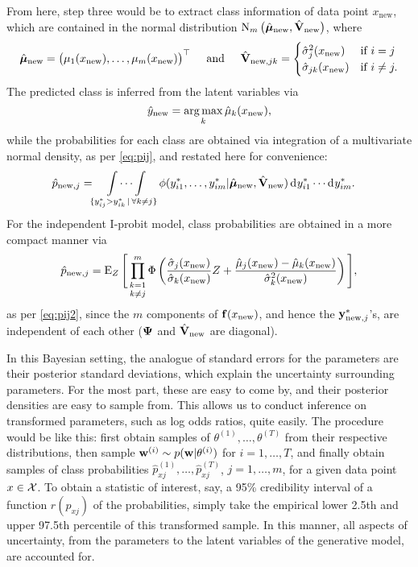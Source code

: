 From here, step three would be to extract class information of data point $x_\text{new}$, which are contained in the normal distribution $\operatorname{N}_{m}\big(\hat{{\bm\mu}}_{\text{new}}, \hat{{\mathbf V}}_{\text{new}} \big)$, where
\begin{equation*}
  \hat{{\bm\mu}}_{\text{new}} = \big(\mu_1(x_\text{new}),\dots, \mu_m(x_\text{new}) \big)^\top 
  \hspace{0.5cm}\text{and}\hspace{0.5cm}
  \hat{{\mathbf V}}_{{\text{new}},jk} = 
  \begin{cases}
    \hat\sigma_j^2(x_\text{new}) & \text{if } i = j \\
    \hat\sigma_{jk}(x_\text{new}) & \text{if } i \neq j. \\
  \end{cases}
\end{equation*}
The predicted class is inferred from the latent variables via
\[
  \hat y_{\text{new}} = \operatorname*{arg\,max}_k \hat\mu_k(x_{\text{new}}), 
\]
while the probabilities for each class are obtained via integration of a multivariate normal density, as per \cref{eq:pij}, and restated here for convenience:
\begin{align*}
  \hat p_{\text{new},j} 
  &=  \idotsint\displaylimits_{\{y_{ij}^* > y_{ik}^* \,|\, \forall k \neq j\}} \phi(y_{i1}^*, \dots, y_{im}^*|\hat{{\bm\mu}}_{\text{new}}, \hat{{\mathbf V}}_{{\text{new}}}) \operatorname{d}\hspace{0.5pt}\! y_{i1}^* \cdots \operatorname{d}\hspace{0.5pt}\! y_{im}^*.
\end{align*}
For the independent I-probit model, class probabilities are obtained in a more compact manner via
\[
  \hat p_{\text{new},j} 
  = \operatorname{E}_Z \Bigg[ \mathop{\prod_{k=1}^m}_{k\neq j} 
  \Phi \left(\frac{\hat\sigma_j(x_\text{new})}{\hat\sigma_k(x_\text{new})} Z + \frac{\hat\mu_j(x_{\text{new}}) - \hat\mu_k(x_{\text{new}})}{\hat\sigma_k^2(x_\text{new})} \right) \Bigg],
\]
as per \cref{eq:pij2}, since the $m$ components of ${\mathbf f}(x_{\text{new}})$, and hence the ${\mathbf y}^*_{{\text{new}},j}$'s, are independent of each other (${\bm\Psi}$ and $\hat{{\mathbf V}}_{\text{new}}$ are diagonal).

In this Bayesian setting, the analogue of standard errors for the parameters are their posterior standard deviations, which  explain the uncertainty surrounding parameters.
For the most part, these are easy to come by, and their posterior densities are easy to sample from.
This allows us to conduct inference on transformed parameters, such as log odds ratios, quite easily.
The procedure would be like this: first obtain samples of $\theta^{(1)},\dots,\theta^{(T)}$ from their respective distributions, then sample ${\mathbf w}^{(i)} \sim p({\mathbf w}|\theta^{(i)})$ for $i=1,\dots,T$, and finally obtain samples of class probabilities $\hat p_{xj}^{(1)},\dots,\hat p_{xj}^{(T)}$, $j=1,\dots,m$, for a given data point $x\in{\mathcal X}$.
To obtain a statistic of interest, say, a 95\% credibility interval of a function $r(p_{xj})$ of the probabilities, simply take the empirical lower 2.5th and upper 97.5th percentile of this transformed sample.
In this manner, all aspects of uncertainty, from the parameters to the latent variables of the generative model, are accounted for.

